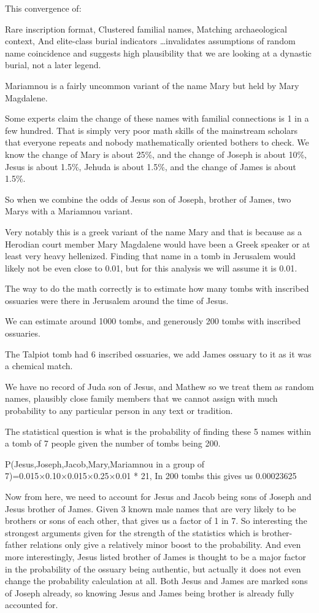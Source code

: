This convergence of:

Rare inscription format, Clustered familial names, Matching archaeological context, And elite-class burial indicators \ldots invalidates assumptions of random name coincidence and suggests high plausibility that we are looking at a dynastic burial, not a later legend.

Mariamnou is a fairly uncommon variant of the name Mary but held by Mary Magdalene.

Some experts claim the change of these names with familial connections is 1 in a few hundred.
That is simply very poor math skills of the mainstream scholars that everyone repeats and nobody mathematically oriented bothers to check.
We know the change of Mary is about 25\%, and the change of Joseph is about 10\%, Jesus is about 1.5\%, Jehuda is about 1.5\%, and the change of James is about 1.5\%.

So when we combine the odds of Jesus son of Joseph, brother of James, two Marys with a Mariamnou variant.

Very notably this is a greek variant of the name Mary and that is because as a Herodian court member Mary Magdalene would have been a Greek speaker or at least very heavy hellenized.
Finding that name in a tomb in Jerusalem would likely not be even close to 0.01, but for this analysis we will assume it is 0.01.

The way to do the math correctly is to estimate how many tombs with inscribed ossuaries were there in Jerusalem around the time of Jesus.

We can estimate around 1000 tombs, and generously 200 tombs with inscribed ossuaries.

The Talpiot tomb had 6 inscribed ossuaries, we add James ossuary to it as it was a chemical match.

We have no record of Juda son of Jesus, and Mathew so we treat them as random names, plausibly close family members that we cannot assign with much probability to any particular person in any text or tradition.

The statistical question is what is the probability of finding these 5 names within a tomb of 7 people given the number of tombs being 200.

P(Jesus,Joseph,Jacob,Mary,Mariamnou in a group of 7)=0.015×0.10×0.015×0.25×0.01 * 21, In 200 tombs this gives us 0.00023625

Now from here, we need to account for Jesus and Jacob being sons of Joseph and Jesus brother of James.
Given 3 known male names that are very likely to be brothers or sons of each other, that gives us a factor of 1 in 7.
So interesting the strongest arguments given for the strength of the statistics which is brother-father relations only give a relatively minor boost to the probability.
And even more interestingly, Jesus listed brother of James is thought to be a major factor in the probability of the ossuary being authentic, but actually it does not even change the probability calculation at all.
Both Jesus and James are marked sons of Joseph already, so knowing Jesus and James being brother is already fully accounted for.

